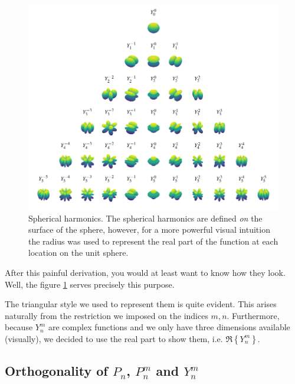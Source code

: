 \begin{figure}
  \centering
  \includegraphics[width=\linewidth]{papers/kugel/figures/python/spherical-harmonics-triangle}
  \caption{
    \label{kugel:fig:spherical-harmonics}
    Spherical harmonics. The spherical harmonics are defined \emph{on} the
    surface of the sphere, however, for a more powerful visual intuition the
    radius was used to represent the real part of the function at each location
    on the unit sphere. 
  }
\end{figure}
After this painful derivation, you would at least want to know how they look. 
Well, the figure \ref{kugel:fig:spherical-harmonics} serves precisely this 
purpose. 

The triangular style we used to represent them is quite evident. This arises 
naturally from the restriction we imposed on the indices $m,n$. Furthermore, 
because $Y^m_n$ are complex functions and we only have three dimensions 
available (visually), we decided to use the real part 
to show them, i.e. $\Re\left\{Y^m_n\right\}$.
\subsection{Orthogonality of $P_n$, $P^m_n$ and $Y^m_n$}
\label{kugel:sec:construction:orthogonality}

